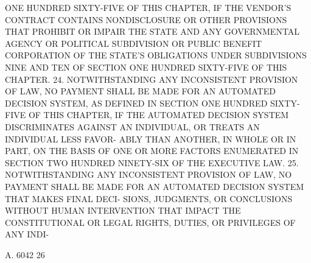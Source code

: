  ONE HUNDRED  SIXTY-FIVE  OF  THIS  CHAPTER,  IF  THE  VENDOR'S  CONTRACT
 CONTAINS  NONDISCLOSURE  OR OTHER PROVISIONS THAT PROHIBIT OR IMPAIR THE
 STATE AND ANY GOVERNMENTAL AGENCY OR  POLITICAL  SUBDIVISION  OR  PUBLIC
 BENEFIT  CORPORATION  OF THE STATE'S OBLIGATIONS UNDER SUBDIVISIONS NINE
 AND TEN OF SECTION ONE HUNDRED SIXTY-FIVE OF THIS CHAPTER.
   24. NOTWITHSTANDING ANY INCONSISTENT  PROVISION  OF  LAW,  NO  PAYMENT
 SHALL  BE  MADE  FOR AN AUTOMATED DECISION SYSTEM, AS DEFINED IN SECTION
 ONE HUNDRED SIXTY-FIVE OF THIS CHAPTER, IF THE AUTOMATED DECISION SYSTEM
 DISCRIMINATES AGAINST AN INDIVIDUAL, OR TREATS AN INDIVIDUAL LESS FAVOR-
 ABLY THAN ANOTHER, IN WHOLE OR IN PART, ON THE  BASIS  OF  ONE  OR  MORE
 FACTORS  ENUMERATED  IN  SECTION TWO HUNDRED NINETY-SIX OF THE EXECUTIVE
 LAW.
   25. NOTWITHSTANDING ANY INCONSISTENT  PROVISION  OF  LAW,  NO  PAYMENT
 SHALL  BE  MADE  FOR AN AUTOMATED DECISION SYSTEM THAT MAKES FINAL DECI-
 SIONS, JUDGMENTS, OR CONCLUSIONS WITHOUT HUMAN INTERVENTION THAT  IMPACT
 THE  CONSTITUTIONAL  OR LEGAL RIGHTS, DUTIES, OR PRIVILEGES OF ANY INDI-

 A. 6042                            26
 
